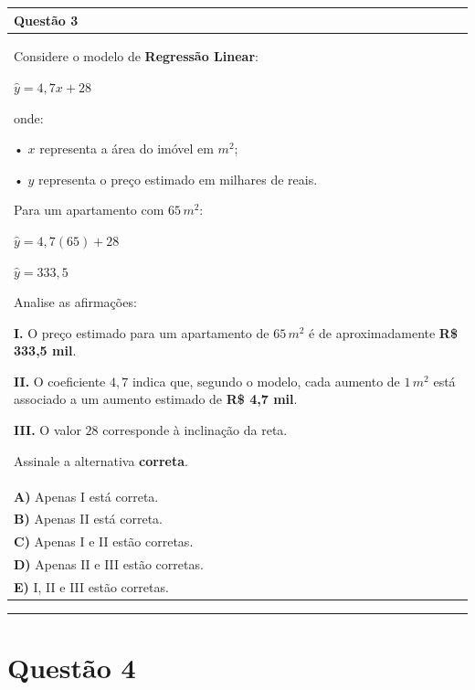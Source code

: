 \documentclass[
]{book}
\begin{document}
\begin{longtable}[]{@{}
  >{\raggedright\arraybackslash}p{}@{}}
\toprule\noalign{}
\begin{minipage}[b]{\linewidth}\raggedright
\textbf{Questão 3}
\end{minipage} \\
\midrule\noalign{}
\endhead
\bottomrule\noalign{}
\endlastfoot
Considere o modelo de \textbf{Regressão Linear}:

\(\hat{y}=4{,}7x+28\)

onde:

• \(x\) representa a área do imóvel em \(m^2\);

• \(\hat{y}\) representa o preço estimado em milhares de reais.

Para um apartamento com \(65\,m^2\):

\(\hat{y}=4{,}7(65)+28\)

\(\hat{y}=333{,}5\)

Analise as afirmações:

\textbf{I.} O preço estimado para um apartamento de \(65\,m^2\) é de
aproximadamente \textbf{R\$ 333,5 mil}.

\textbf{II.} O coeficiente \(4{,}7\) indica que, segundo o modelo, cada
aumento de \(1\,m^2\) está associado a um aumento estimado de \textbf{R\$ 4,7
mil}.

\textbf{III.} O valor \(28\) corresponde à inclinação da reta.

Assinale a alternativa \textbf{correta}. \\
\textbf{A)} Apenas I está correta. \\
\textbf{B)} Apenas II está correta. \\
\textbf{C)} Apenas I e II estão corretas. \\
\textbf{D)} Apenas II e III estão corretas. \\
\textbf{E)} I, II e III estão corretas. \\
\end{longtable}

\begin{center}\rule{0.5\linewidth}{0.5pt}\end{center}

\section{Questão 4}\label{questuxe3o-4}
\end{document}
